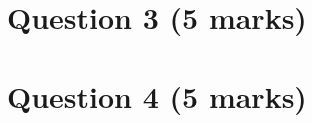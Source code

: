\documentclass{article}
\begin{document}
\section{Question 3 (5 marks)}

\section{Question 4 (5 marks)}
\end{document}
